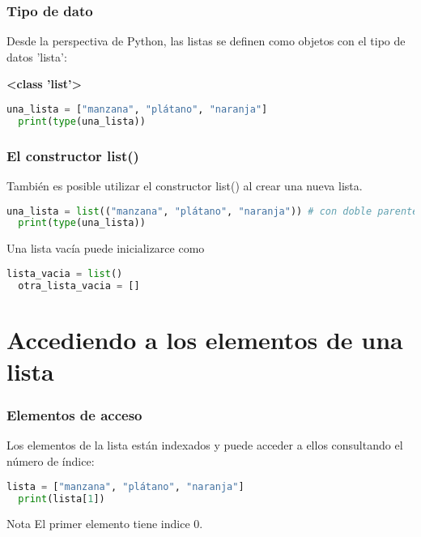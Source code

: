 \begin{frame}[fragile]
  \frametitle{Tipo de dato}

  Desde la perspectiva de Python, las listas se definen
  como objetos con el tipo de datos 'lista':

  \vspace{\baselineskip}
  \textbf{<class 'list'>}

  \vspace{\baselineskip}
  \begin{lstlisting}[language=Python]
  una_lista = ["manzana", "plátano", "naranja"]
  print(type(una_lista)) 
  \end{lstlisting}
\end{frame}

\begin{frame}[fragile]
  \frametitle{El constructor list()}

  También es posible utilizar el constructor
  \textcolor{codeKeyword2}{list}() al crear una nueva lista. 

  \vspace{\baselineskip}
  \begin{lstlisting}[language=Python]
  una_lista = list(("manzana", "plátano", "naranja")) # con doble parentesis
  print(type(una_lista)) 
  \end{lstlisting}

  \vspace{\baselineskip}
  Una lista vacía puede inicializarce como

  \vspace{\baselineskip}
  \begin{lstlisting}[language=Python]
  lista_vacia = list()
  otra_lista_vacia = []
  \end{lstlisting}

\end{frame}

\section{Accediendo a los elementos de una lista}

\begin{frame}[fragile]
  \frametitle{Elementos de acceso}

  Los elementos de la lista están indexados y puede acceder
  a ellos consultando el número de índice:

  \vspace{\baselineskip}
  \begin{lstlisting}[language=Python]
  lista = ["manzana", "plátano", "naranja"]
  print(lista[1]) 
  \end{lstlisting}

  \begin{exampleblock}{Nota}
    El primer elemento tiene indice 0.
  \end{exampleblock}
\end{frame}

